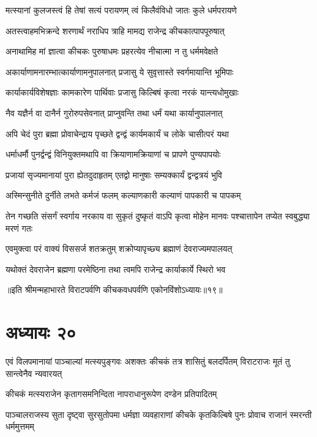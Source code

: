 \twolineshloka
{मत्स्यानां कुलजस्त्वं हि तेषां सत्यं परायणम्}
{त्वं किलैवंविधो जातः कुले धर्मपरायणे}


\twolineshloka
{अतस्त्वाहमभिक्रन्दे शरणार्थं नराधिप}
{त्राहि मामद्य राजेन्द्र कीचकात्पापपूरुषात्}


\twolineshloka
{अनाथामिह मां ज्ञात्वा कीचकः पुरुषाधमः}
{प्रहरत्येव नीचात्मा न तु धर्ममवेक्षते}


\twolineshloka
{अकार्याणामनारम्भात्कार्याणामनुपालनात्}
{प्रजासु ये सुवृत्तास्ते स्वर्गमायान्ति भूमिपाः}


\twolineshloka
{कार्याकार्यविशेषज्ञाः कामकारेण पार्थिवाः}
{प्रजासु किल्बिषं कृत्वा नरकं यान्त्यधोमुखाः}


\twolineshloka
{नैव यज्ञैर्न वा दानैर्न गुरोरुपसेवनात्}
{प्राप्नुवन्ति तथा धर्मं यथा कार्यानुपालनात्}


\twolineshloka
{अपि चेदं पुरा ब्रह्मा प्रोवाचेन्द्राय पृच्छते}
{द्वन्द्वं कार्यमकार्यं च लोके चासीत्परं यथा}


\twolineshloka
{धर्माधर्मौ पुनर्द्वन्द्वं विनियुक्तमथापि वा}
{क्रियाणामक्रियाणां च प्रापणे पुण्यपापयोः}


\twolineshloka
{प्रजायां सृज्यमानायां पुरा ह्येतदुदाहृतम्}
{एतद्वो मानुषाः सम्यक्कार्यं द्वन्द्वत्रयं भुवि}


\twolineshloka
{अस्मिन्सुनीते दुर्नीते लभते कर्मजं फलम्}
{कल्याणकारी कल्याणं पापकारी च पापकम्}


\threelineshloka
{तेन गच्छति संसर्गं स्वर्गाय नरकाय वा}
{सुकृतं दुष्कृतं वाऽपि कृत्वा मोहेन मानवः}
{पश्चात्तापेन तप्येत स्वबुद्ध्या मरणं गतः}


\twolineshloka
{एवमुक्त्वा परं वाक्यं विससर्ज शतक्रतुम्}
{शक्रोप्यापृच्छ्य ब्रह्माणं देवराज्यमपालयत्}


\twolineshloka
{यथोक्तं देवराजेन ब्रह्मणा परमेष्ठिना}
{तथा त्वमपि राजेन्द्र कार्याकार्ये स्थिरो भव}

॥इति श्रीमन्महाभारते विराटपर्वणि कीचकवधपर्वणि एकोनविंशोऽध्यायः॥१९॥

\chapter{अध्यायः २०}

\threelineshloka
{एवं विलपमानायां पाञ्चाल्यां मत्स्यपुङ्गवः}
{अशक्तः कीचकं तत्र शासितुं बलदर्पितम्}
{विराटराजः मूतं तु सान्त्वेनैव न्यवारयत्}


\twolineshloka
{कीचकं मत्स्यराजेन कृतागसमनिन्दिता}
{नापराधानुरूपेण दण्डेन प्रतिपादितम्}


\threelineshloka
{पाञ्चालराजस्य सुता दृष्ट्वा सुरसुतोपमा}
{धर्मज्ञा व्यवहाराणां कीचके कृतकिल्बिषे}
{पुनः प्रोवाच राजानं स्मरन्ती धर्ममुत्तमम्}


